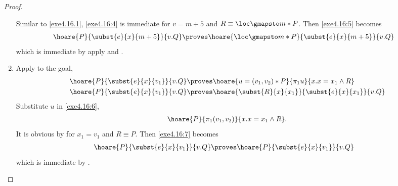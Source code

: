 \begin{proof}
\begin{enumerate}
      Similar to \ref{exe4.16.1}, \eqref{exe4.16:4} is immediate for
      $v = m + 5$ and $R \equiv \loc \gmapsto m * P$. Then \eqref{exe4.16:5}
      becomes
      \begin{align*}
        \hoare{P}{\subst{e}{x}{m + 5}}{v.Q} \proves &
        \hoare{\loc \gmapsto m * P}{\subst{e}{x}{m + 5}}{v.Q}
      \end{align*}
      which is immediate by apply  and
      .

    \item Apply  to the goal,
      \begin{align}
        \hoare{P}{\subst{e}{x}{v_1}}{v.Q} \proves &
        \hoare{u = (v_1, v_2) * P}{\pi_1 u}{x.x = x_1 \wedge R} \label{exe4.16:6} \\
        \hoare{P}{\subst{e}{x}{v_1}}{v.Q} \proves &
        \hoare{\subst{R}{x}{x_1}}{\subst{e}{x}{x_1}}{v.Q} \label{exe4.16:7}
      \end{align}
      Substitute $u$ in \eqref{exe4.16:6},
      \begin{align*}
        \hoare{P}{\pi_1 (v_1, v_2)}{x.x = x_1 \wedge R}.
      \end{align*}
      It is obvious by  for $x_1 = v_1$ and $R \equiv P$.
      Then \eqref{exe4.16:7} becomes
      \begin{align*}
        \hoare{P}{\subst{e}{x}{v_1}}{v.Q} \proves &
        \hoare{P}{\subst{e}{x}{v_1}}{v.Q}
      \end{align*}
      which is immediate by .
  \end{enumerate}
\end{proof}
